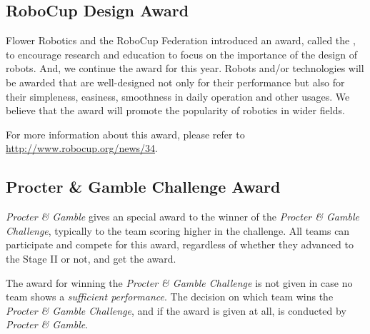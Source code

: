 \subsection{RoboCup Design Award}
\label{award:design}
Flower Robotics and the RoboCup Federation introduced an award, called the , to encourage research and education to focus on the importance of the design of robots. And, we continue the award for this year. Robots and/or technologies will be awarded that are well-designed not only for their performance but also for their simpleness, easiness, smoothness in daily operation and other usages. We believe that the award will promote the popularity of robotics in wider fields.

For more information about this award, please refer to \url{http://www.robocup.org/news/34}.


\subsection{Procter \& Gamble Challenge Award}
\label{award:skill}
\textit{Procter \& Gamble} gives an special award to the winner of the \textit{Procter \& Gamble Challenge}, typically to the team scoring higher in the challenge.
All teams can participate and compete for this award, regardless of whether they advanced to the Stage II or not, and get the award.

The award for winning the \textit{Procter \& Gamble Challenge} is not given in case no team shows a \emph{sufficient performance}. The decision on which team wins the \textit{Procter \& Gamble Challenge}, and if the award is given at all, is conducted by \textit{Procter \& Gamble}.
